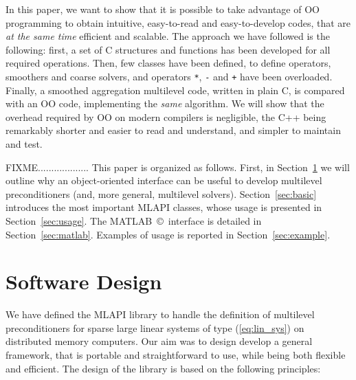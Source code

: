 \documentclass{article}[11pt]
\newcommand{\MLAPI}  {{\sc MLAPI }}
\begin{document}
In this paper, we want to show
that it is possible to take advantage of OO programming to obtain intuitive,
easy-to-read and easy-to-develop codes, that are {\sl at the same time}
efficient and scalable. The approach we have followed is the following:
first, a set of C structures and functions has been developed for all 
required operations. Then, few classes have been defined, to define
operators, smoothers and coarse solvers, and operators \verb!*!, \verb!-! and
\verb!+! have been overloaded. Finally, a smoothed aggregation multilevel
code, written in plain C, is compared with an OO code, implementing the 
{\sl same} algorithm.  We will show that the overhead
required by OO on modern compilers is negligible, the C++ being remarkably
shorter and easier to read and understand, and simpler to maintain and test.


\smallskip

FIXME...................
This paper is organized as follows. First, in Section~\ref{sec:design}
we will outline why an object-oriented interface can be useful to develop
multilevel preconditioners (and, more general, multilevel solvers).
Section~\ref{sec:basic} introduces the most important \MLAPI classes, whose
usage is presented in Section~\ref{sec:usage}. The MATLAB~\copyright~interface is
detailed in Section~\ref{sec:matlab}. Examples of usage is reported in
Section~\ref{sec:example}. 

\section{Software Design}
\label{sec:design}

We have defined the \MLAPI library to handle the definition of multilevel
preconditioners for sparse large linear systems of type (\ref{eq:lin_sys})
  on distributed memory computers.
Our aim was to design develop a general framework, that is portable and
straightforward to use, while being both flexible and efficient. 
The design of the library is based on the following principles:
\end{document}
